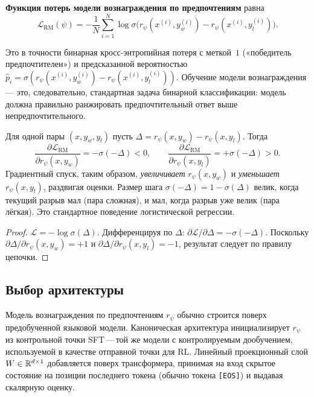 \begin{definition}
\label{def:rm-loss}
\textbf{Функция потерь модели вознаграждения по предпочтениям} равна
\begin{equation}
\label{eq:rm-loss}
\boxed{
\mathcal{L}_{\mathrm{RM}}(\psi)
= -\frac{1}{N}\sum_{i=1}^{N}
\log \sigma\!\bigl(r_\psi(x^{(i)}, y_w^{(i)}) - r_\psi(x^{(i)}, y_l^{(i)})\bigr).
}
\end{equation}
\end{definition}

Это в точности бинарная кросс-энтропийная потеря с меткой~$1$ («победитель предпочтителен») и предсказанной вероятностью $\hat{p}_i = \sigma(r_\psi(x^{(i)}, y_w^{(i)}) - r_\psi(x^{(i)}, y_l^{(i)}))$. Обучение модели вознаграждения --- это, следовательно, стандартная задача бинарной классификации: модель должна правильно ранжировать предпочтительный ответ выше непредпочтительного.

\begin{proposition}
\label{prop:rm-gradient}
Для одной пары $(x, y_w, y_l)$ пусть $\Delta = r_\psi(x,y_w) - r_\psi(x,y_l)$. Тогда
\[
\frac{\partial \mathcal{L}_{\mathrm{RM}}}{\partial r_\psi(x,y_w)} = -\sigma(-\Delta) < 0, \qquad
\frac{\partial \mathcal{L}_{\mathrm{RM}}}{\partial r_\psi(x,y_l)} = +\sigma(-\Delta) > 0.
\]
Градиентный спуск, таким образом, \emph{увеличивает} $r_\psi(x,y_w)$ и \emph{уменьшает} $r_\psi(x,y_l)$, раздвигая оценки. Размер шага $\sigma(-\Delta) = 1 - \sigma(\Delta)$ велик, когда текущий разрыв мал (пара сложная), и мал, когда разрыв уже велик (пара лёгкая). Это стандартное поведение логистической регрессии.
\end{proposition}

\begin{proof}
$\mathcal{L} = -\log\sigma(\Delta)$. Дифференцируя по $\Delta$: $\partial\mathcal{L}/\partial\Delta = -\sigma(-\Delta)$. Поскольку $\partial\Delta/\partial r_\psi(x,y_w) = +1$ и $\partial\Delta/\partial r_\psi(x,y_l) = -1$, результат следует по правилу цепочки.
\end{proof}

\subsection{Выбор архитектуры}

Модель вознаграждения по предпочтениям $r_\psi$ обычно строится поверх предобученной языковой модели. Каноническая архитектура инициализирует $r_\psi$ из контрольной точки SFT\,---\,той же модели с контролируемым дообучением, используемой в качестве отправной точки для RL. Линейный проекционный слой $W \in \mathbb{R}^{d \times 1}$ добавляется поверх трансформера, принимая на вход скрытое состояние на позиции последнего токена (обычно токена \texttt{[EOS]}) и выдавая скалярную оценку.


